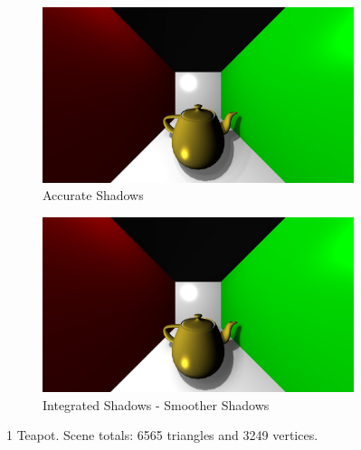 \begin{figure}
        \centering
        \begin{subfigure}[b]{1.0\textwidth}
                \includegraphics[width=\textwidth]{AltResults/1teapotOLD.jpg}
                \caption{Accurate Shadows}
        \end{subfigure}
        \centering
        \begin{subfigure}[b]{1.0\textwidth}
                \includegraphics[width=\textwidth]{AltResults/1Teapot.jpg}
                \caption{Integrated Shadows - Smoother Shadows}
        \end{subfigure}
        \caption{1 Teapot. Scene totals: 6565 triangles and 3249 vertices.}\label{fig:teapotCompare}
\end{figure}

